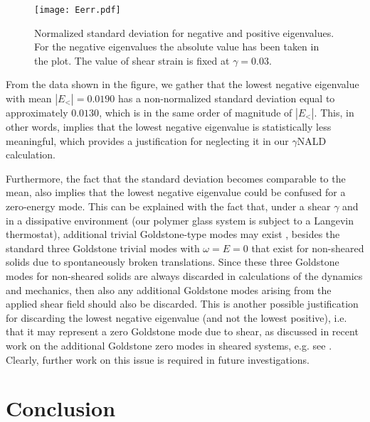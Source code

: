 \documentclass[pre,twocolumn,aps,superscriptaddress,showpacs]{revtex4-1}
\begin{document}
\begin{figure}
  \centering
\texttt{[image: Eerr.pdf]}
\caption{Normalized standard deviation for negative and positive eigenvalues. For the negative eigenvalues the absolute value has been taken in the plot. The value of shear strain is fixed at $\gamma=0.03$.}
\label{fig:Estats}
\end{figure}

From the data shown in the figure, we gather that the lowest negative eigenvalue with mean $|E_{<}|=0.0190$ has a non-normalized standard deviation equal to approximately $0.0130$, which is in the same order of magnitude of $|E_{<}|$. 
This, in other words, implies that the lowest negative eigenvalue is statistically less meaningful, which provides a justification for neglecting it in our $\gamma$NALD calculation.

Furthermore, the fact that the standard deviation becomes comparable to the mean, also implies that the lowest negative eigenvalue could be confused for a zero-energy mode. 
This can be explained with the fact that, under a shear $\gamma$ and in a dissipative environment (our polymer glass system is subject to a Langevin thermostat), additional trivial Goldstone-type modes may exist \cite{Minami}, besides the standard three Goldstone trivial modes with $\omega=E=0$ that exist for non-sheared solids due to spontaneously broken translations. Since these three Goldstone modes for non-sheared solids are always discarded in calculations of the dynamics and mechanics, then also any additional Goldstone modes arising from the applied shear field should also be discarded.
This is another possible justification for discarding the lowest negative eigenvalue (and not the lowest positive), i.e. that it may represent a zero Goldstone mode due to shear, as discussed in recent work on the additional Goldstone zero modes in sheared systems, e.g. see \cite{Minami}. Clearly, further work on this issue is required in future investigations.

\section{Conclusion}
\end{document}
